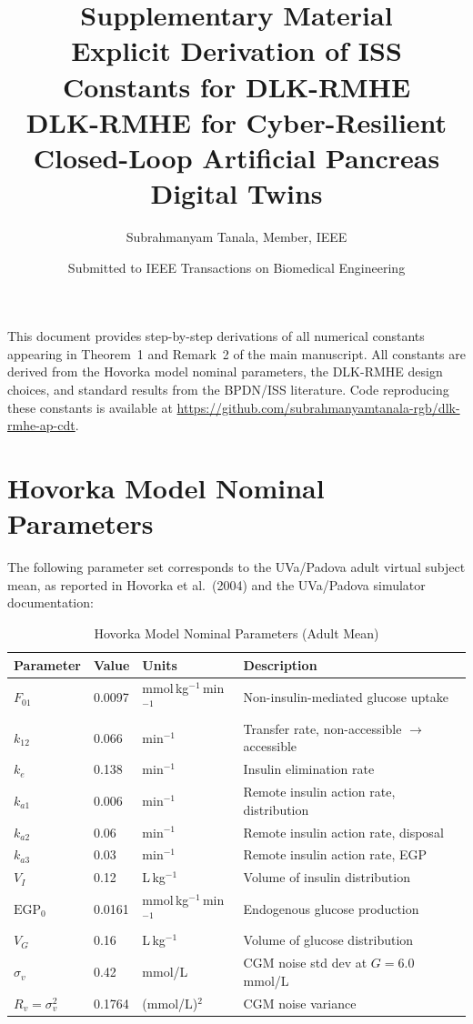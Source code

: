 \documentclass[11pt,a4paper]{article}
\title{\textbf{Supplementary Material}\\[6pt]
Explicit Derivation of ISS Constants for DLK-RMHE\\[4pt]
{\large DLK-RMHE for Cyber-Resilient Closed-Loop Artificial Pancreas Digital Twins}}
\author{Subrahmanyam Tanala, Member, IEEE}
\date{Submitted to IEEE Transactions on Biomedical Engineering}
\begin{document}
\maketitle
\tableofcontents
\vspace{1em}

\noindent This document provides step-by-step derivations of all numerical
constants appearing in Theorem~1 and Remark~2 of the main manuscript. All
constants are derived from the Hovorka model nominal parameters, the DLK-RMHE
design choices, and standard results from the BPDN/ISS literature. Code
reproducing these constants is available at
\url{https://github.com/subrahmanyamtanala-rgb/dlk-rmhe-ap-cdt}.

\section{Hovorka Model Nominal Parameters}

The following parameter set corresponds to the UVa/Padova adult virtual subject
mean, as reported in Hovorka et al.\ (2004) and the UVa/Padova simulator
documentation:

\begin{table}[h!]
\centering
\caption{Hovorka Model Nominal Parameters (Adult Mean)}
\begin{tabular}{llll}
\toprule
Parameter & Value & Units & Description\\
\midrule
$F_{01}$  & 0.0097 & mmol\,kg$^{-1}$\,min$^{-1}$ & Non-insulin-mediated glucose uptake\\
$k_{12}$  & 0.066  & min$^{-1}$  & Transfer rate, non-accessible $\to$ accessible\\
$k_e$     & 0.138  & min$^{-1}$  & Insulin elimination rate\\
$k_{a1}$  & 0.006  & min$^{-1}$  & Remote insulin action rate, distribution\\
$k_{a2}$  & 0.06   & min$^{-1}$  & Remote insulin action rate, disposal\\
$k_{a3}$  & 0.03   & min$^{-1}$  & Remote insulin action rate, EGP\\
$V_I$     & 0.12   & L\,kg$^{-1}$ & Volume of insulin distribution\\
$\text{EGP}_0$ & 0.0161 & mmol\,kg$^{-1}$\,min$^{-1}$ & Endogenous glucose production\\
$V_G$     & 0.16   & L\,kg$^{-1}$ & Volume of glucose distribution\\
$\sigma_v$& 0.42   & mmol/L  & CGM noise std dev at $G=6.0$\,mmol/L\\
$R_v = \sigma_v^2$ & 0.1764 & (mmol/L)$^2$ & CGM noise variance\\
\bottomrule
\end{tabular}
\end{table}
\end{document}
